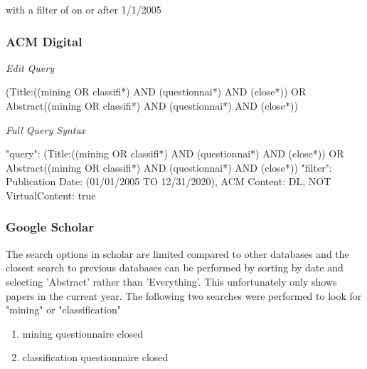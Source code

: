 \noindent
with a filter of on or after 1/1/2005

\subsubsection{ACM Digital}
\noindent
\textit{Edit Query}

\noindent
(Title:((mining OR classifi*) AND (questionnai*) AND (close*)) OR Abstract((mining OR classifi*) AND (questionnai*) AND (close*))

\noindent
\textit{Full Query Syntax}

\noindent
"query": { (Title:((mining OR classifi*) AND (questionnai*) AND (close*)) OR Abstract((mining OR classifi*) AND (questionnai*) AND (close*))}
"filter": { Publication Date: (01/01/2005 TO 12/31/2020), ACM Content: DL, NOT VirtualContent: true }

\subsubsection{Google Scholar}
\noindent
The search options in scholar are limited compared to other databases and the closest search to previous databases can be performed by sorting by date and selecting 'Abstract' rather than 'Everything'. This unfortunately only shows papers in the current year. The following two searches were performed to look for "mining" or "classification"

\begin{enumerate}
  \item  mining questionnaire closed
  \item  classification questionnaire closed
\end{enumerate}

